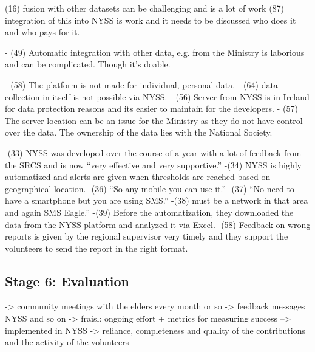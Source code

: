 (16) fusion with other datasets can be challenging and is a lot of work
(87) integration of this into NYSS is work and it needs to be discussed who does it and who pays for it.

-	(49) Automatic integration with other data, e.g. from the Ministry is laborious and can be complicated. Though it’s doable.

-	(58) The platform is not made for individual, personal data.
-	(64) data collection in itself is not possible via NYSS.
-	(56) Server from NYSS is in Ireland for data protection reasons and its easier to maintain for the developers.
-	(57) The server location can be an issue for the Ministry as they do not have control over the data. The ownership of the data lies with the National Society. 



-(33) NYSS was developed over the course of a year with a lot of feedback from the SRCS and is now “very effective and very supportive.”
-(34) NYSS is highly automatized and alerts are given when thresholds are reached based on geographical location.
-(36) “So any mobile you can use it.”
-(37) “No need to have a smartphone but you are using SMS.”
-(38) must be a network in that area and again SMS Eagle.”
-(39) Before the automatization, they downloaded the data from the NYSS platform and analyzed it via Excel.
-(58) Feedback on wrong reports is given by the regional supervisor very timely and they support the volunteers to send the report in the right format.






\subsection{Stage 6: Evaluation}
-> community meetings with the elders every month or so
-> feedback messages NYSS and so on
-> fraisl: ongoing effort + metrics for measuring success --> implemented in NYSS -> reliance, completeness and quality of the contributions and the activity of the volunteers









